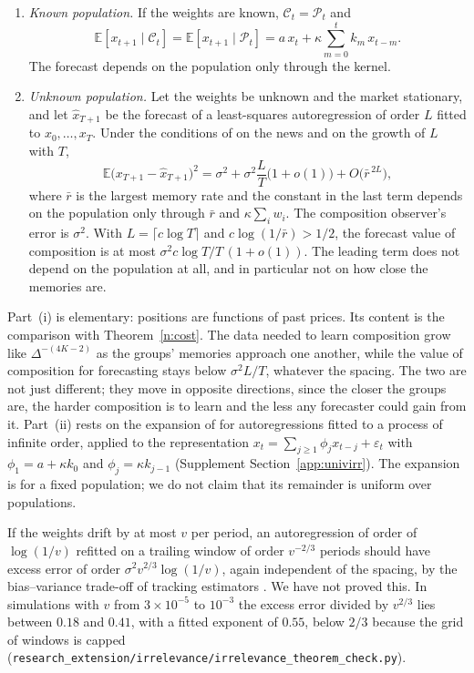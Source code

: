 \begin{theorem}\label{n:irr}
\begin{enumerate}[label=(\roman*),itemsep=1pt]
\item \emph{Known population.} If the weights are known, $\mathcal C_t=\mathcal P_t$ and
\[
\mathbb E[x_{t+1}\mid\mathcal C_t]=\mathbb E[x_{t+1}\mid\mathcal P_t]=a\,x_t+\kappa\sum_{m=0}^{t}k_m\,x_{t-m}.
\]
The forecast depends on the population only through the kernel.
\item \emph{Unknown population.} Let the weights be unknown and the market stationary, and let $\hat x_{T+1}$ be the forecast of a least-squares autoregression of order $L$ fitted to $x_0,\ldots,x_T$. Under the conditions of \citet{ingwei2003} on the news and on the growth of $L$ with $T$,
\[
\mathbb E\big(x_{T+1}-\hat x_{T+1}\big)^2=\sigma^2+\sigma^2\frac{L}{T}\big(1+o(1)\big)+O\big(\bar r^{\,2L}\big),
\]
where $\bar r$ is the largest memory rate and the constant in the last term depends on the population only through $\bar r$ and $\kappa\sum_iw_i$. The composition observer's error is $\sigma^2$. With $L=\lceil c\log T\rceil$ and $c\log(1/\bar r)>1/2$, the forecast value of composition is at most $\sigma^2c\log T/T\,(1+o(1))$. The leading term does not depend on the population at all, and in particular not on how close the memories are.
\end{enumerate}
\end{theorem}

Part~(i) is elementary: positions are functions of past prices. Its content is the comparison with Theorem~\ref{n:cost}. The data needed to learn composition grow like $\Delta^{-(4K-2)}$ as the groups' memories approach one another, while the value of composition for forecasting stays below $\sigma^2L/T$, whatever the spacing. The two are not just different; they move in opposite directions, since the closer the groups are, the harder composition is to learn and the less any forecaster could gain from it. Part~(ii) rests on the expansion of \citet{ingwei2003} for autoregressions fitted to a process of infinite order, applied to the representation $x_t=\sum_{j\ge1}\phi_jx_{t-j}+\varepsilon_t$ with $\phi_1=a+\kappa k_0$ and $\phi_j=\kappa k_{j-1}$ (Supplement Section~\ref{app:univirr}). The expansion is for a fixed population; we do not claim that its remainder is uniform over populations.

\begin{remark}
If the weights drift by at most $v$ per period, an autoregression of order of $\log(1/v)$ refitted on a trailing window of order $v^{-2/3}$ periods should have excess error of order $\sigma^2v^{2/3}\log(1/v)$, again independent of the spacing, by the bias--variance trade-off of tracking estimators \citep{guoljung1995}. We have not proved this. In simulations with $v$ from $3\times10^{-5}$ to $10^{-3}$ the excess error divided by $v^{2/3}$ lies between $0.18$ and $0.41$, with a fitted exponent of $0.55$, below $2/3$ because the grid of windows is capped (\nolinkurl{research_extension/irrelevance/irrelevance_theorem_check.py}).
\end{remark}

